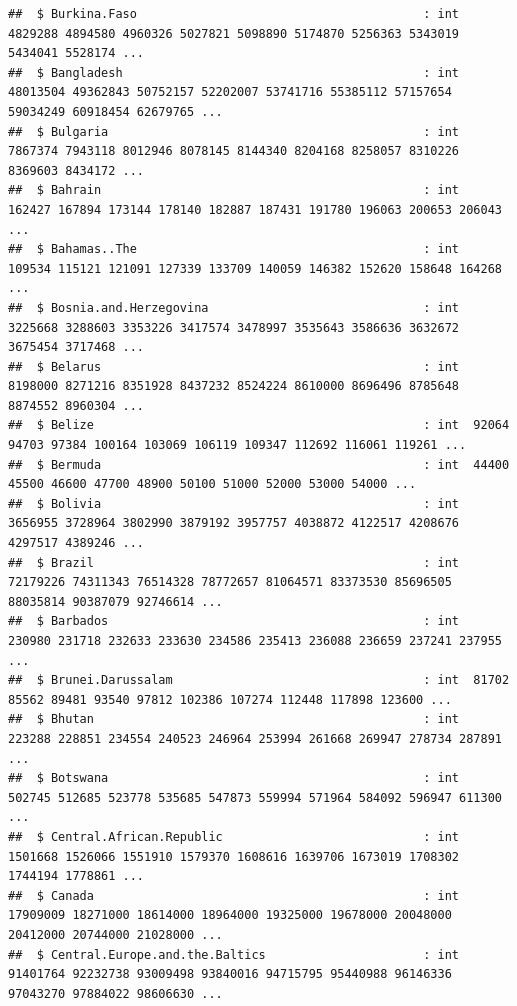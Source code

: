 \documentclass[12pt,]{article}
\begin{document}
\begin{verbatim}
##  $ Burkina.Faso                                        : int  4829288 4894580 4960326 5027821 5098890 5174870 5256363 5343019 5434041 5528174 ...
##  $ Bangladesh                                          : int  48013504 49362843 50752157 52202007 53741716 55385112 57157654 59034249 60918454 62679765 ...
##  $ Bulgaria                                            : int  7867374 7943118 8012946 8078145 8144340 8204168 8258057 8310226 8369603 8434172 ...
##  $ Bahrain                                             : int  162427 167894 173144 178140 182887 187431 191780 196063 200653 206043 ...
##  $ Bahamas..The                                        : int  109534 115121 121091 127339 133709 140059 146382 152620 158648 164268 ...
##  $ Bosnia.and.Herzegovina                              : int  3225668 3288603 3353226 3417574 3478997 3535643 3586636 3632672 3675454 3717468 ...
##  $ Belarus                                             : int  8198000 8271216 8351928 8437232 8524224 8610000 8696496 8785648 8874552 8960304 ...
##  $ Belize                                              : int  92064 94703 97384 100164 103069 106119 109347 112692 116061 119261 ...
##  $ Bermuda                                             : int  44400 45500 46600 47700 48900 50100 51000 52000 53000 54000 ...
##  $ Bolivia                                             : int  3656955 3728964 3802990 3879192 3957757 4038872 4122517 4208676 4297517 4389246 ...
##  $ Brazil                                              : int  72179226 74311343 76514328 78772657 81064571 83373530 85696505 88035814 90387079 92746614 ...
##  $ Barbados                                            : int  230980 231718 232633 233630 234586 235413 236088 236659 237241 237955 ...
##  $ Brunei.Darussalam                                   : int  81702 85562 89481 93540 97812 102386 107274 112448 117898 123600 ...
##  $ Bhutan                                              : int  223288 228851 234554 240523 246964 253994 261668 269947 278734 287891 ...
##  $ Botswana                                            : int  502745 512685 523778 535685 547873 559994 571964 584092 596947 611300 ...
##  $ Central.African.Republic                            : int  1501668 1526066 1551910 1579370 1608616 1639706 1673019 1708302 1744194 1778861 ...
##  $ Canada                                              : int  17909009 18271000 18614000 18964000 19325000 19678000 20048000 20412000 20744000 21028000 ...
##  $ Central.Europe.and.the.Baltics                      : int  91401764 92232738 93009498 93840016 94715795 95440988 96146336 97043270 97884022 98606630 ...

\end{verbatim}
\end{document}
